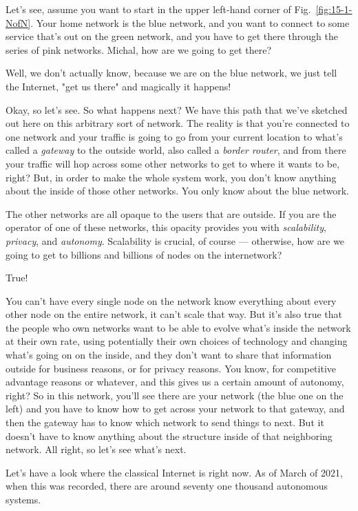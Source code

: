 Let's see, assume you want to start in the upper left-hand corner of Fig.~\ref{fig:15-1-NofN}. Your home network is the blue network, and you want to connect to some service that's out on the green network, and you have to get there through the series of pink networks. Michal, how are we going to get there?

\mmm Well, we don't actually know, because we are on the blue network, we just tell the Internet, "get us there" and magically it happens!

\rrr Okay, so let's see. So what happens next? We have this path that we've sketched out here on this arbitrary sort of network. The reality is that you're connected to one network and your traffic is going to go from your current location to what's called a \emph{gateway} to the outside world, also called a \emph{border router}, and from there your traffic will hop across some other networks to get to where it wants to be, right? But, in order to make the whole system work, you don't know anything about the inside of those other networks. You only know about the blue network.

The other networks are all opaque to the users that are outside. If you are the operator of one of these networks, this opacity provides you with \emph{scalability}, \emph{privacy}, and \emph{autonomy}. Scalability is crucial, of course --- otherwise, how are we going to get to billions and billions of nodes on the internetwork?

\mmm True!

\rrr You can't have every single node on the network know everything about every other node on the entire network, it can't scale that way. But it's also true that the people who own networks want to be able to evolve what's inside the network at their own rate, using potentially their own choices of technology and changing what's going on on the inside, and they don't want to share that information outside for business reasons, or for privacy reasons. You know, for competitive advantage reasons or whatever, and this gives us a certain amount of autonomy, right? So in this network, you'll see there are your network (the blue one on the left) and you have to know how to get across your network to that gateway, and then the gateway has to know which network to send things to next. But it doesn't have to know anything about the structure inside of that neighboring network. All right, so let's see what's next.

\mmm Let's have a look where the classical Internet is right now. As of March of 2021, when this was recorded, there are around seventy one thousand autonomous systems.

